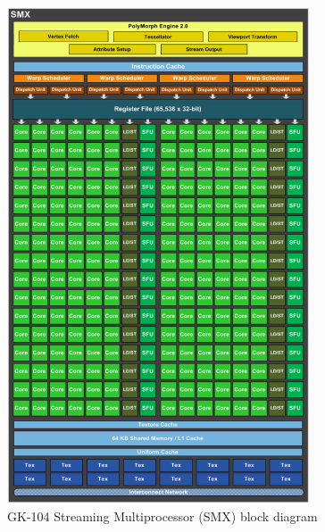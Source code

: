 \documentclass[11pt, oneside, a4paper]{article}
\begin{document}
\begin{figure}[tb]
	\begin{center}
		\includegraphics[width=0.8\textwidth]{SMX}
	\end{center}
	\caption{GK-104 Streaming Multiprocessor (SMX) block diagram}
	\label{fig:SMX}
\end{figure}
\end{document}
